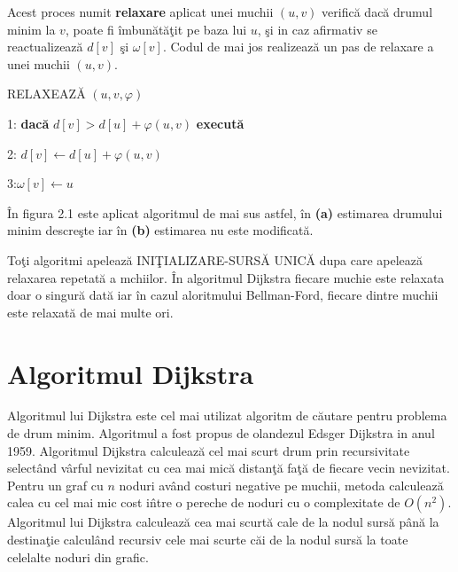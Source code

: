 \documentclass[11pt,a4paper]{report}
\begin{document}
    Acest proces numit \textbf{relaxare} aplicat unei muchii $(u,v)$ verific\u a dac\u a drumul minim la $v$, poate fi \^ imbun\u at\u a\c tit pe baza lui $u$, \c si in caz afirmativ se reactualizeaz\u a $d[v]$ \c si $\omega[v]$. Codul de mai jos realizeaz\u a un pas de relaxare a unei muchii $(u,v)$.
    
      	\vspace{0.3cm}
    RELAXEAZ\u A $(u,v,\varphi)$
    
    \vspace{0.1cm}
    1: \textbf{dac\u a} $d[v] > d[u] + \varphi(u,v)$ \textbf{execut\u a}
    
    2: \hspace{0.5cm}$d[v]\longleftarrow d[u] + \varphi(u,v)$
    
    3:\hspace{0.6cm}$\omega[v]\longleftarrow u$
    
          	\vspace{0.3cm}
    \^ In figura 2.1 este aplicat algoritmul de mai sus astfel, \^ in \textbf{(a)} estimarea drumului minim descre\c ste iar \^ in \textbf{(b)} estimarea nu este modificat\u a.
    
    To\c ti algoritmi apeleaz\u a INI\c TIALIZARE-SURS\u A UNIC\u A dupa care apeleaz\u a relaxarea repetat\u a a mchiilor. \^ In algoritmul Dijkstra fiecare muchie este relaxata doar o singur\u a dat\u a iar \^ in cazul aloritmului Bellman-Ford, fiecare dintre muchii este relaxat\u a de mai multe ori.
    
    \section{Algoritmul Dijkstra}
    
    Algoritmul lui Dijkstra este cel mai utilizat algoritm de c\u autare pentru problema de drum minim. Algoritmul a fost propus de olandezul Edsger Dijkstra in anul 1959. Algoritmul Dijkstra calculeaz\u a cel mai scurt drum prin recursivitate select\^ and v\^ arful nevizitat cu cea mai mic\u a distan\c t\u a fa\c t\u a de fiecare vecin nevizitat. Pentru un graf cu $n$ noduri av\^ and costuri negative pe muchii, metoda calculeaz\u a calea cu cel mai mic cost i\^ ntre o pereche de noduri cu o complexitate de $O(n^2)$. Algoritmul lui Dijkstra calculeaz\u a cea mai scurt\u a cale de la nodul surs\u a p\^ an\u a la destina\c tie calcul\^ and recursiv cele mai scurte c\u ai de la nodul surs\u a la toate celelalte noduri din grafic.
    
\end{document}
